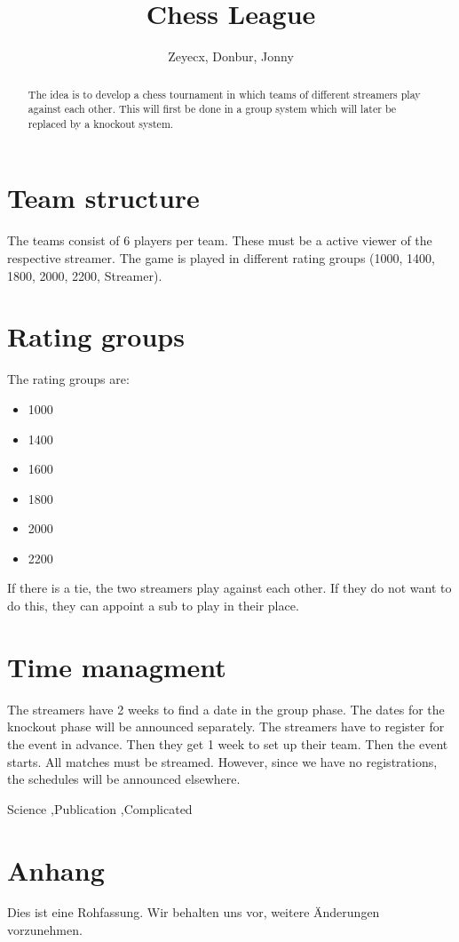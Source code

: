\documentclass[preprint,12pt]{elsarticle}
\begin{document}
	
\begin{frontmatter}
			
\title{Chess League}
		
		
\author{Zeyecx, Donbur, Jonny}
		
\address{German Paper}
	 
\begin{abstract}
	The idea is to develop a chess tournament in which teams of different streamers play against each other.
	This will first be done in a group system which will later be replaced by a knockout system. 
\end{abstract}
\end{frontmatter}
\linenumbers
\section{Team structure}
The teams consist of 6 players per team. These must be a active viewer of the respective streamer. 
The game is played in different rating groups (1000, 1400, 1800, 2000, 2200, Streamer).

\section{Rating groups}

The rating groups are:
\begin{itemize}
	\item 1000
	\item 1400 
	\item 1600
	\item 1800
	\item 2000
	\item 2200
\end{itemize}
If there is a tie, the two streamers play against each other. If they do not want to do this, they can appoint a sub to play in their place.

\section{Time managment}
The streamers have 2 weeks to find a date in the group phase. The dates for the knockout phase will be announced separately.
The streamers have to register for the event in advance. Then they get 1 week to set up their team.
Then the event starts.
All matches must be streamed.
However, since we have no registrations, the schedules will be announced elsewhere.
\begin{keyword}
	Science \sep Publication \sep Complicated
	
	
\end{keyword}
\section{Anhang}
Dies ist eine Rohfassung. Wir behalten uns vor, weitere Änderungen vorzunehmen.

\linenumbers


\end{document}
